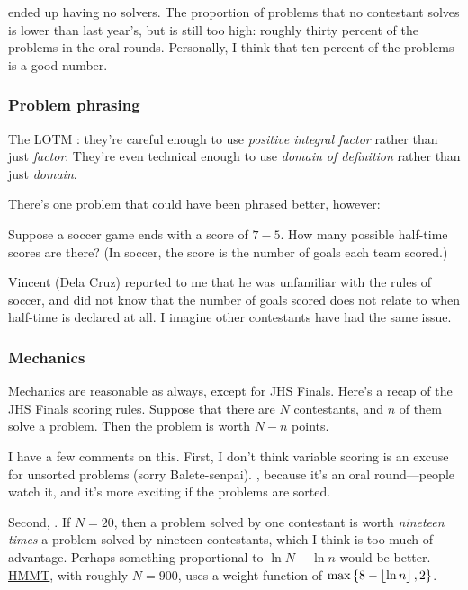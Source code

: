 \documentclass[11pt,paper=letter]{scrartcl}
\begin{document}
\noindent ended up having no solvers. The proportion of problems that no contestant solves is lower than last year's, but is still too high: roughly thirty percent of the problems in the oral rounds. Personally, I think that ten percent of the problems is a good number.

\subsubsection*{Problem phrasing}

The LOTM : they're careful enough to use \emph{positive integral factor} rather than just \emph{factor}. They're even technical enough to use \emph{domain of definition} rather than just \emph{domain}. 

There's one problem that could have been phrased better, however:

\begin{probboxed}
   Suppose a soccer game ends with a score of $7-5$. How many possible half-time scores are there? (In soccer, the score is the number of goals each team scored.)
\end{probboxed}

Vincent (Dela Cruz) reported to me that he was unfamiliar with the rules of soccer, and did not know that the number of goals scored does not relate to when half-time is declared at all. I imagine other contestants have had the same issue.

\subsubsection*{Mechanics}

Mechanics are reasonable as always, except for JHS Finals. Here's a recap of the JHS Finals scoring rules. Suppose that there are $N$ contestants, and $n$ of them solve a problem. Then the problem is worth $N - n$ points. 

I have a few comments on this. First, I don't think variable scoring is an excuse for unsorted problems (sorry Balete-senpai). , because it's an oral round---people watch it, and it's more exciting if the problems are sorted.

Second, . If $N = 20$, then a problem solved by one contestant is worth \emph{nineteen times} a problem solved by nineteen contestants, which I think is too much of advantage. Perhaps something proportional to $\ln N - \ln n$ would be better. \href{http://www.hmmt.co/static/scoring-algorithm.pdf}{HMMT}, with roughly $N = 900$, uses a weight function of $\max\left\{ 8 - \left\lfloor \ln n \right\rfloor, 2 \right\}$.
\end{document}
